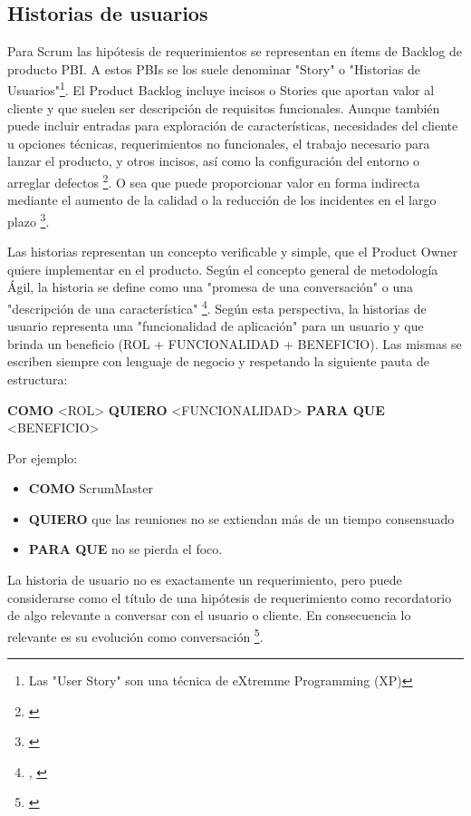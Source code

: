 \subsection{Historias de usuarios}

Para Scrum las hipótesis de requerimientos se representan en ítems de Backlog de producto PBI. A estos PBIs se los suele denominar "Story" o "Historias de Usuarios"\footnote{Las "User Story" son una técnica de eXtremme Programming (XP)}. El Product Backlog incluye incisos o Stories que aportan valor al cliente y que suelen ser descripción de requisitos funcionales. Aunque también puede incluir entradas para exploración de características, necesidades del cliente u opciones técnicas, requerimientos no funcionales, el trabajo necesario para lanzar el producto, y otros incisos, así como la configuración del entorno o arreglar defectos \footnote{\cite{Scrum-Institute-2015}}. O sea que puede proporcionar valor en forma indirecta mediante el aumento de la calidad o la reducción de los incidentes en el largo plazo \footnote{\cite{Scrum-Institute-2015}}.

Las historias representan un concepto verificable y simple, que el Product Owner quiere implementar en el producto. Según el concepto general de metodología Ágil, la historia se define como una "promesa de una conversación" o una "descripción de una característica" \footnote{\cite{UNTREF-2014}, \cite{Dan-North-2015}}. Según esta perspectiva, la historias de usuario representa una "funcionalidad de aplicación" para un usuario y que brinda un beneficio (ROL + FUNCIONALIDAD + BENEFICIO). Las mismas se escriben siempre con lenguaje de negocio y respetando la siguiente pauta de estructura:\newline

\textbf{COMO} <ROL> \textbf{QUIERO} <FUNCIONALIDAD> \textbf{PARA QUE} <BENEFICIO>\newline

Por ejemplo:

\begin{itemize}
\item \textbf{COMO} ScrumMaster 
\item \textbf{QUIERO} que las reuniones no se extiendan más de un tiempo consensuado 
\item \textbf{PARA QUE} no se pierda el foco.
\end{itemize}

La historia de usuario no es exactamente un requerimiento, pero puede considerarse como el título de una hipótesis de requerimiento como recordatorio de algo relevante a conversar con el usuario o cliente. En consecuencia lo relevante es su evolución como conversación \footnote{\cite{UNTREF-2014}}.

